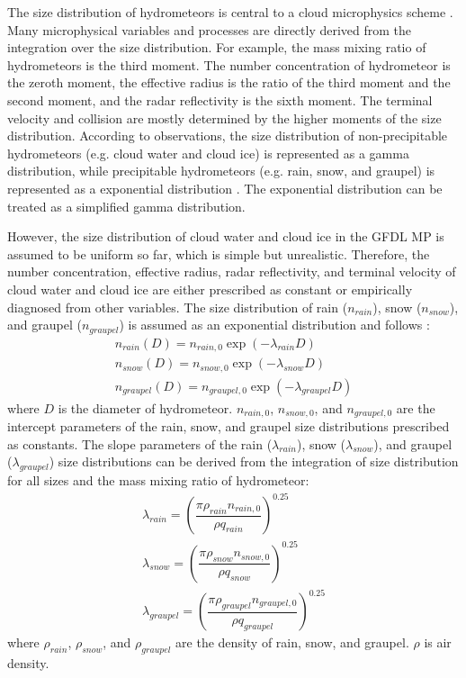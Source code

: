 \documentclass[letterpaper,titlepage,10pt]{article}
\numberwithin{equation}{section}
\begin{document}
The size distribution of hydrometeors is central to a cloud microphysics scheme \citep{khain2018phys}. Many microphysical variables and processes are directly derived from the integration over the size distribution. For example, the mass mixing ratio of hydrometeors is the third moment. The number concentration of hydrometeor is the zeroth moment, the effective radius is the ratio of the third moment and the second moment, and the radar reflectivity is the sixth moment. The terminal velocity and collision are mostly determined by the higher moments of the size distribution. According to observations, the size distribution of non-precipitable hydrometeors (e.g. cloud water and cloud ice) is represented as a gamma distribution, while precipitable hydrometeors (e.g. rain, snow, and graupel) is represented as a exponential distribution \citep{pruppacher2010micr}. The exponential distribution can be treated as a simplified gamma distribution.

However, the size distribution of cloud water and cloud ice in the GFDL MP is assumed to be uniform so far, which is simple but unrealistic. Therefore, the number concentration, effective radius, radar reflectivity, and terminal velocity of cloud water and cloud ice are either prescribed as constant or empirically diagnosed from other variables. The size distribution of rain ($n_{rain}$), snow ($n_{snow}$), and graupel ($n_{graupel}$) is assumed as an exponential distribution and follows \citet{lin1983bulk}:
\begin{gather}
	n_{rain} (D) = n_{rain,0} \exp \left(- \lambda_{rain} D \right) \\
	n_{snow} (D) = n_{snow,0} \exp \left(- \lambda_{snow} D \right) \\
	n_{graupel} (D) = n_{graupel,0} \exp \left(- \lambda_{graupel} D \right)
\end{gather}
where $D$ is the diameter of hydrometeor. $n_{rain,0}$, $n_{snow,0}$, and $n_{graupel,0}$ are the intercept parameters of the rain, snow, and graupel size distributions prescribed as constants. The slope parameters of the rain ($\lambda_{rain}$), snow ($\lambda_{snow}$), and graupel ($\lambda_{graupel}$) size distributions can be derived from the integration of size distribution for all sizes and the mass mixing ratio of hydrometeor:
\begin{gather}
	\lambda_{rain} = \left(\dfrac{\pi \rho_{rain} n_{rain,0}}{\rho q_{rain}} \right)^{0.25} \\
	\lambda_{snow} = \left(\dfrac{\pi \rho_{snow} n_{snow,0}}{\rho q_{snow}} \right)^{0.25} \\
	\lambda_{graupel} = \left(\dfrac{\pi \rho_{graupel} n_{graupel,0}}{\rho q_{graupel}} \right)^{0.25}
\end{gather}
where $\rho_{rain}$, $\rho_{snow}$, and $\rho_{graupel}$ are the density of rain, snow, and graupel. $\rho$ is air density.
\end{document}
